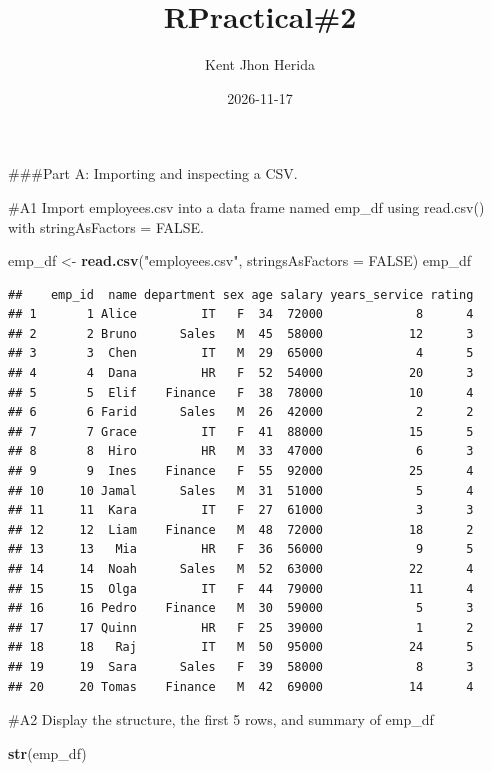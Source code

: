 \documentclass[
]{article}
\title{RPractical\#2}
\author{Kent Jhon Herida}
\date{2026-11-17}
\newenvironment{Shaded}{\begin{snugshade}}{\end{snugshade}}
\newcommand{\AttributeTok}[1]{\textcolor[rgb]{0.13,0.29,0.53}{#1}}
\newcommand{\ConstantTok}[1]{\textcolor[rgb]{0.56,0.35,0.01}{#1}}
\newcommand{\FunctionTok}[1]{\textcolor[rgb]{0.13,0.29,0.53}{\textbf{#1}}}
\newcommand{\NormalTok}[1]{#1}
\newcommand{\OtherTok}[1]{\textcolor[rgb]{0.56,0.35,0.01}{#1}}
\newcommand{\StringTok}[1]{\textcolor[rgb]{0.31,0.60,0.02}{#1}}
\begin{document}
\maketitle

\#\#\#Part A: Importing and inspecting a CSV.

\#A1 Import employees.csv into a data frame named emp\_df using
read.csv() with stringAsFactors = FALSE.

\begin{Shaded}
\begin{Highlighting}[]
\NormalTok{emp\_df }\OtherTok{\textless{}{-}} \FunctionTok{read.csv}\NormalTok{(}\StringTok{"employees.csv"}\NormalTok{, }\AttributeTok{stringsAsFactors =} \ConstantTok{FALSE}\NormalTok{)}
\NormalTok{emp\_df}
\end{Highlighting}
\end{Shaded}

\begin{verbatim}
##    emp_id  name department sex age salary years_service rating
## 1       1 Alice         IT   F  34  72000             8      4
## 2       2 Bruno      Sales   M  45  58000            12      3
## 3       3  Chen         IT   M  29  65000             4      5
## 4       4  Dana         HR   F  52  54000            20      3
## 5       5  Elif    Finance   F  38  78000            10      4
## 6       6 Farid      Sales   M  26  42000             2      2
## 7       7 Grace         IT   F  41  88000            15      5
## 8       8  Hiro         HR   M  33  47000             6      3
## 9       9  Ines    Finance   F  55  92000            25      4
## 10     10 Jamal      Sales   M  31  51000             5      4
## 11     11  Kara         IT   F  27  61000             3      3
## 12     12  Liam    Finance   M  48  72000            18      2
## 13     13   Mia         HR   F  36  56000             9      5
## 14     14  Noah      Sales   M  52  63000            22      4
## 15     15  Olga         IT   F  44  79000            11      4
## 16     16 Pedro    Finance   M  30  59000             5      3
## 17     17 Quinn         HR   F  25  39000             1      2
## 18     18   Raj         IT   M  50  95000            24      5
## 19     19  Sara      Sales   F  39  58000             8      3
## 20     20 Tomas    Finance   M  42  69000            14      4
\end{verbatim}

\#A2 Display the structure, the first 5 rows, and summary of emp\_df

\begin{Shaded}
\begin{Highlighting}[]
\FunctionTok{str}\NormalTok{(emp\_df)}
\end{Highlighting}
\end{Shaded}
\end{document}

